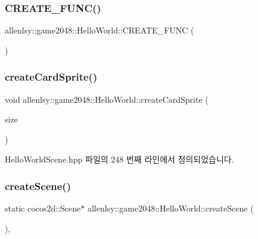 \subsubsection{\texorpdfstring{C\+R\+E\+A\+T\+E\+\_\+\+F\+U\+N\+C()}{CREATE\_FUNC()}}
{\footnotesize\ttfamily allenlsy\+::game2048\+::\+Hello\+World\+::\+C\+R\+E\+A\+T\+E\+\_\+\+F\+U\+NC (\begin{DoxyParamCaption}\item[{\hyperlink{classallenlsy_1_1game2048_1_1_hello_world}{Hello\+World}}]{ }\end{DoxyParamCaption})}

\mbox{\label{classallenlsy_1_1game2048_1_1_hello_world_ad55dd12c9e76eba2e7c79dafbd103e54}} 
\subsubsection{\texorpdfstring{create\+Card\+Sprite()}{createCardSprite()}}
{\footnotesize\ttfamily void allenlsy\+::game2048\+::\+Hello\+World\+::create\+Card\+Sprite (\begin{DoxyParamCaption}\item[{cocos2d\+::\+Size}]{size }\end{DoxyParamCaption})\hspace{0.3cm}{\ttfamily [inline]}}



Hello\+World\+Scene.\+hpp 파일의 248 번째 라인에서 정의되었습니다.

\mbox{\label{classallenlsy_1_1game2048_1_1_hello_world_a86ca8a563151e5e5d308f98ff6c36f95}} 
\subsubsection{\texorpdfstring{create\+Scene()}{createScene()}}
{\footnotesize\ttfamily static cocos2d\+::\+Scene$\ast$ allenlsy\+::game2048\+::\+Hello\+World\+::create\+Scene (\begin{DoxyParamCaption}{ }\end{DoxyParamCaption})\hspace{0.3cm}{\ttfamily [inline]}, {\ttfamily [static]}}



